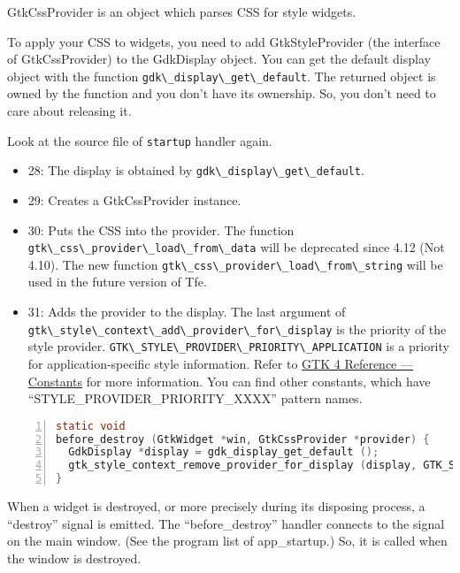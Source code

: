 GtkCssProvider is an object which parses CSS for style widgets.

To apply your CSS to widgets, you need to add GtkStyleProvider (the
interface of GtkCssProvider) to the GdkDisplay object. You can get the
default display object with the function
\passthrough{\lstinline!gdk\_display\_get\_default!}. The returned
object is owned by the function and you don't have its ownership. So,
you don't need to care about releasing it.

Look at the source file of \passthrough{\lstinline!startup!} handler
again.

\begin{itemize}
\tightlist
\item
  28: The display is obtained by
  \passthrough{\lstinline!gdk\_display\_get\_default!}.
\item
  29: Creates a GtkCssProvider instance.
\item
  30: Puts the CSS into the provider. The function
  \passthrough{\lstinline!gtk\_css\_provider\_load\_from\_data!} will be
  deprecated since 4.12 (Not 4.10). The new function
  \passthrough{\lstinline!gtk\_css\_provider\_load\_from\_string!} will
  be used in the future version of Tfe.
\item
  31: Adds the provider to the display. The last argument of
  \passthrough{\lstinline!gtk\_style\_context\_add\_provider\_for\_display!}
  is the priority of the style provider.
  \passthrough{\lstinline!GTK\_STYLE\_PROVIDER\_PRIORITY\_APPLICATION!}
  is a priority for application-specific style information. Refer to
  \href{https://docs.gtk.org/gtk4/index.html\#constants}{GTK 4 Reference
  --- Constants} for more information. You can find other constants,
  which have ``STYLE\_PROVIDER\_PRIORITY\_XXXX'' pattern names.
\end{itemize}

\begin{lstlisting}[language=C, numbers=left]
static void
before_destroy (GtkWidget *win, GtkCssProvider *provider) {
  GdkDisplay *display = gdk_display_get_default ();
  gtk_style_context_remove_provider_for_display (display, GTK_STYLE_PROVIDER (provider));
}
\end{lstlisting}

When a widget is destroyed, or more precisely during its disposing
process, a ``destroy'' signal is emitted. The ``before\_destroy''
handler connects to the signal on the main window. (See the program list
of app\_startup.) So, it is called when the window is destroyed.


